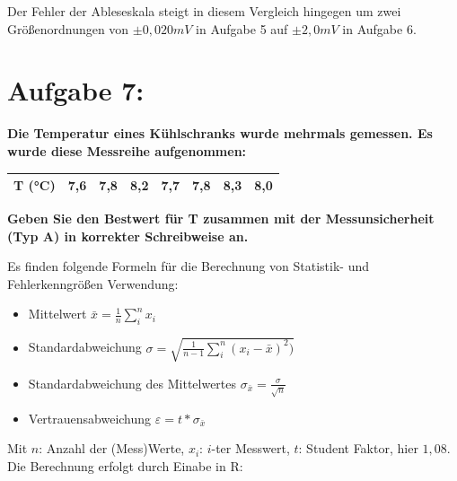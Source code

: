 \documentclass[
]{article}
\providecommand{\tightlist}{%
  \setlength{\itemsep}{0pt}\setlength{\parskip}{0pt}}
\begin{document}
Der Fehler der Ableseskala steigt in diesem Vergleich hingegen um zwei
Größenordnungen von \(\pm 0,020mV\) in Aufgabe 5 auf \(\pm 2,0mV\) in
Aufgabe 6.

\hypertarget{aufgabe-7}{%
\section{Aufgabe 7:}\label{aufgabe-7}}

\textbf{Die Temperatur eines Kühlschranks wurde mehrmals gemessen. Es
wurde diese Messreihe aufgenommen:}

\begin{longtable}[]{@{}llllllll@{}}
\toprule()
\endhead
T (°C) & 7,6 & 7,8 & 8,2 & 7,7 & 7,8 & 8,3 & 8,0 \\
\bottomrule()
\end{longtable}

\newpage

\textbf{Geben Sie den Bestwert für T zusammen mit der Messunsicherheit
(Typ A) in korrekter Schreibweise an.}

Es finden folgende Formeln für die Berechnung von Statistik- und
Fehlerkenngrößen Verwendung:

\begin{itemize}
\tightlist
\item
  Mittelwert \(\bar{x} = \frac{1}{n}\sum\limits_{i}^{n}x_i\)
\item
  Standardabweichung
  \(\sigma = \sqrt{\frac{1}{n-1}\sum\limits_{i}^{n}(x_i-\bar{x})^2)}\)
\item
  Standardabweichung des Mittelwertes
  \(\sigma_{\bar{x}} = \frac{\sigma}{\sqrt{n}}\)
\item
  Vertrauensabweichung \(\varepsilon = t*\sigma_{\bar{x}}\)
\end{itemize}

Mit \(n\): Anzahl der (Mess)Werte, \(x_i\): \(i\)-ter Messwert, \(t\):
Student Faktor, hier \(1,08\). Die Berechnung erfolgt durch Einabe in R:
\end{document}

